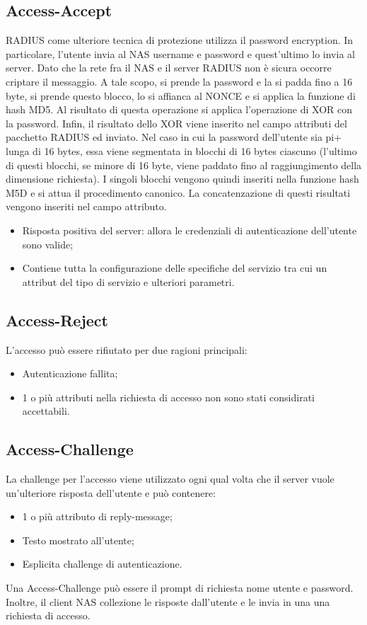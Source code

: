 \documentclass{article}
\theoremstyle{remark}
\begin{document}
\subsection{Access-Accept}
RADIUS come ulteriore tecnica di protezione utilizza il password encryption. In particolare, l'utente invia al NAS username e password e quest'ultimo lo invia al server. Dato che la rete fra il NAS e il server RADIUS non è sicura occorre criptare il messaggio.\newline
A tale scopo, si prende la password e la si padda fino a 16 byte, si prende questo blocco, lo si affianca al NONCE e si applica la funzione di hash MD5. Al risultato di questa operazione si applica l'operazione di XOR con la password. Infin, il risultato dello XOR viene inserito nel campo attributi del pacchetto RADIUS ed inviato.\newline
Nel caso in cui la password dell'utente sia pi+ lunga di 16 bytes, essa viene segmentata in blocchi di 16 bytes ciascuno (l'ultimo di questi blocchi, se minore di 16 byte, viene paddato fino al raggiungimento della dimensione richiesta). I singoli blocchi vengono quindi inseriti nella funzione hash M5D e si attua il procedimento canonico. La concatenzazione di questi risultati vengono inseriti nel campo attributo.
\begin{itemize}
	\item Risposta positiva del server: allora le credenziali di autenticazione dell'utente sono valide;
	\item Contiene tutta la configurazione delle specifiche del servizio tra cui un attribut del tipo di servizio e ulteriori parametri.
\end{itemize}
\subsection{Access-Reject}
L'accesso può essere rifiutato per due ragioni principali:\begin{itemize}
	\item Autenticazione fallita;
	\item 1 o più attributi nella richiesta di accesso non sono stati considirati accettabili.
\end{itemize}
\subsection{Access-Challenge}
La challenge per l'accesso viene utilizzato ogni qual volta che il server vuole un'ulteriore risposta dell'utente e può contenere:\begin{itemize}
	\item 1 o più attributo di reply-message;
	\item Testo mostrato all'utente;
	\item Esplicita challenge di autenticazione.
\end{itemize} Una Access-Challenge può essere il prompt di richiesta nome utente e password.\newline
Inoltre, il client NAS collezione le risposte dall'utente e le invia in una una richiesta di accesso.
\end{document}
